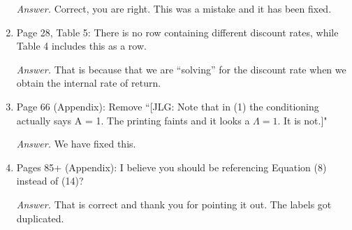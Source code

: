 \begin{enumerate}
\noindent \textit{Answer.} Correct, you are right. This was a mistake and it has been fixed.

\item Page 28, Table 5: There is no row containing different discount rates, while Table 4 includes this as a row.

\noindent \textit{Answer.} That is because that we are ``solving'' for the discount rate when we obtain the internal rate of return. 

\item Page 66 (Appendix): Remove ``[JLG: Note that in (1) the conditioning actually says A = 1. The printing faints and it looks a $\Lambda = 1$. It is not.]"

\noindent \textit{Answer.} We have fixed this. 

\item Pages 85+ (Appendix): I believe you should be referencing Equation (8) instead of (14)?

\noindent \textit{Answer.} That is correct and thank you for pointing it out. The labels got duplicated.

\end{enumerate}

\singlespace





